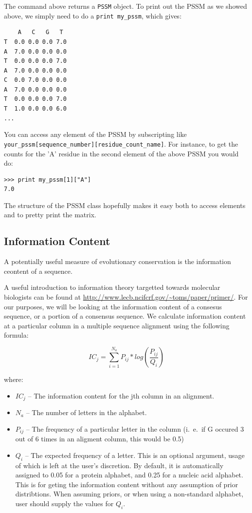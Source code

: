 \documentclass{report}
\begin{document}
The command above returns a \verb|PSSM| object. To print out the PSSM as we showed above, we simply need to do a \verb|print my_pssm|, which gives:

\begin{verbatim}
    A   C   G   T
T  0.0 0.0 0.0 7.0
A  7.0 0.0 0.0 0.0
T  0.0 0.0 0.0 7.0
A  7.0 0.0 0.0 0.0
C  0.0 7.0 0.0 0.0
A  7.0 0.0 0.0 0.0
T  0.0 0.0 0.0 7.0
T  1.0 0.0 0.0 6.0
...
\end{verbatim}

You can access any element of the PSSM by subscripting like \verb|your_pssm[sequence_number][residue_count_name]|. For instance, to get the counts for the 'A' residue in the second element of the above PSSM you would do:

\begin{verbatim}
>>> print my_pssm[1]["A"]
7.0
\end{verbatim}

The structure of the PSSM class hopefully makes it easy both to access elements and to pretty print the matrix.

\subsection{Information Content}
\label{sec:getting_info_content}

A potentially useful measure of evolutionary conservation is the information ceontent of a sequence.

A useful introduction to information theory targetted towards molecular biologists can be found at \url{http://www.lecb.ncifcrf.gov/~toms/paper/primer/}. For our purposes, we will be looking at the information content of a consesus sequence, or a portion of a consensus sequence. We calculate information content at a particular column in a multiple sequence alignment using the following formula:

\begin{displaymath}
IC_{j} = \sum_{i=1}^{N_{a}} P_{ij} * log(\frac{P_{ij}}{Q_{i}})
\end{displaymath}

where:

\begin{itemize}
  \item $IC_{j}$ -- The information content for the jth column in an alignment.
  \item $N_{a}$ -- The number of letters in the alphabet.
  \item $P_{ij}$ -- The frequency of a particular letter in the column (i.~e.~if G occured 3 out of 6 times in an aligment column, this would be 0.5)
  \item $Q_{i}$ --  The expected frequency of a letter. This is an
  optional argument, usage of which is left at the user's
  discretion. By default, it is automatically assigned to 0.05 for a
  protein alphabet, and 0.25 for a nucleic acid alphabet. This is for
  geting the information content without any assumption of prior
  distribtions. When assuming priors, or when using a non-standard
  alphabet, user should supply the values for $Q_{i}$.
\end{itemize}
\end{document}
